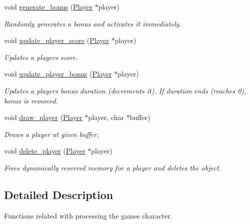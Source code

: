 \begin{DoxyCompactItemize}
void \hyperlink{group__player_gafa760c994949e72cc685e338eca386e6}{generate\+\_\+bonus} (\hyperlink{struct_player}{Player} $\ast$player)
\begin{DoxyCompactList}\small\item\em Randomly generates a bonus and activates it immediately. \end{DoxyCompactList}\item 
void \hyperlink{group__player_ga2fa758d997a2b350ec55272a1cbe41eb}{update\+\_\+player\+\_\+score} (\hyperlink{struct_player}{Player} $\ast$player)
\begin{DoxyCompactList}\small\item\em Updates a player\textquotesingle{}s score. \end{DoxyCompactList}\item 
void \hyperlink{group__player_ga985b6963134729213326a13697741bd2}{update\+\_\+player\+\_\+bonus} (\hyperlink{struct_player}{Player} $\ast$player)
\begin{DoxyCompactList}\small\item\em Updates a player\textquotesingle{}s bonus duration (decrements it). If duration ends (reaches 0), bonus is removed. \end{DoxyCompactList}\item 
void \hyperlink{group__player_ga2c6f1674abdd49f8d225fa2c76b864de}{draw\+\_\+player} (\hyperlink{struct_player}{Player} $\ast$player, char $\ast$buffer)
\begin{DoxyCompactList}\small\item\em Draws a player at given buffer. \end{DoxyCompactList}\item 
void \hyperlink{group__player_ga9d6a1fdd44f008ff5eb4922118cce30a}{delete\+\_\+player} (\hyperlink{struct_player}{Player} $\ast$player)
\begin{DoxyCompactList}\small\item\em Frees dynamically reserved memory for a player and deletes the \textquotesingle{}object\textquotesingle{}. \end{DoxyCompactList}\end{DoxyCompactItemize}


\subsection{Detailed Description}
Functions related with processing the game\textquotesingle{}s character. 



